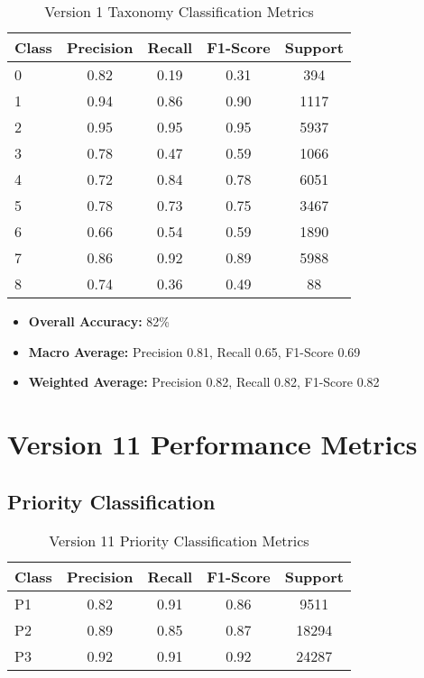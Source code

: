 \begin{table}[h!]
    \centering
    \caption{Version 1 Taxonomy Classification Metrics}
    \label{tab:v1_taxonomy_metrics}
    \begin{tabular}{|l|c|c|c|c|}
    \hline
    \textbf{Class} & \textbf{Precision} & \textbf{Recall} & \textbf{F1-Score} & \textbf{Support} \\
    \hline
    0 & 0.82 & 0.19 & 0.31 & 394 \\
    \hline
    1 & 0.94 & 0.86 & 0.90 & 1117 \\
    \hline
    2 & 0.95 & 0.95 & 0.95 & 5937 \\
    \hline
    3 & 0.78 & 0.47 & 0.59 & 1066 \\
    \hline
    4 & 0.72 & 0.84 & 0.78 & 6051 \\
    \hline
    5 & 0.78 & 0.73 & 0.75 & 3467 \\
    \hline
    6 & 0.66 & 0.54 & 0.59 & 1890 \\
    \hline
    7 & 0.86 & 0.92 & 0.89 & 5988 \\
    \hline
    8 & 0.74 & 0.36 & 0.49 & 88 \\
    \hline
    \end{tabular}
\end{table}

\begin{itemize}
    \item \textbf{Overall Accuracy:} 82\%
    \item \textbf{Macro Average:} Precision 0.81, Recall 0.65, F1-Score 0.69
    \item \textbf{Weighted Average:} Precision 0.82, Recall 0.82, F1-Score 0.82
\end{itemize}

\newpage

\section*{Version 11 Performance Metrics}

\subsection*{Priority Classification}

\begin{table}[h!]
    \centering
    \caption{Version 11 Priority Classification Metrics}
    \label{tab:v11_priority_metrics}
    \begin{tabular}{|l|c|c|c|c|}
    \hline
    \textbf{Class} & \textbf{Precision} & \textbf{Recall} & \textbf{F1-Score} & \textbf{Support} \\
    \hline
    P1 & 0.82 & 0.91 & 0.86 & 9511 \\
    \hline
    P2 & 0.89 & 0.85 & 0.87 & 18294 \\
    \hline
    P3 & 0.92 & 0.91 & 0.92 & 24287 \\
    \hline
    \end{tabular}
\end{table}

